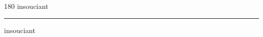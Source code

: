 
\begin{frame}
\begin{center}
\begin{turn}{180}
{\fontsize{2.5cm}{1em}\selectfont insouciant}
\end{turn}
\vspace{1em}\par  
\hrule
\vspace{1em}\par  
{\fontsize{2.5cm}{1em}\selectfont insouciant}
\end{center}
\end{frame}

